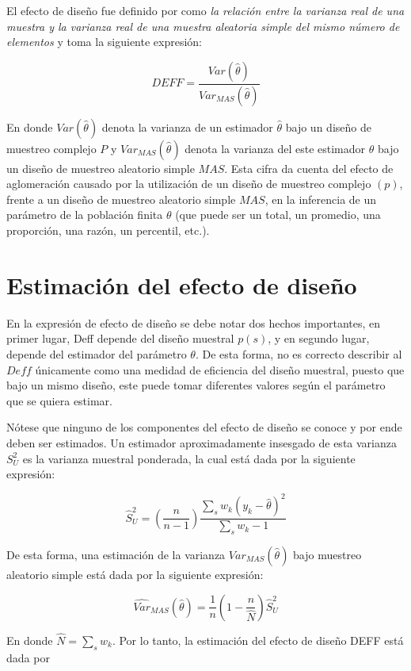 \documentclass[
  10pt,
  spanish,
]{book}
\begin{document}
El efecto de diseño fue definido por \citet[página 258]{Kish_1965} como \emph{la relación entre la varianza real de una muestra y la varianza real de una muestra aleatoria simple del mismo número de elementos} y toma la siguiente expresión:

\[
DEFF=\frac{Var(\hat{\theta})}{Var_{MAS}(\hat{\theta})}
\]

En donde \(Var(\hat{\theta})\) denota la varianza de un estimador \(\hat{\theta}\) bajo un diseño de muestreo complejo \(P\) y \(Var_{MAS}(\hat{\theta})\) denota la varianza del este estimador \(\hat{\theta}\) bajo un diseño de muestreo aleatorio simple \(MAS\). Esta cifra da cuenta del efecto de aglomeración causado por la utilización de un diseño de muestreo complejo \((p)\), frente a un diseño de muestreo aleatorio simple \(MAS\), en la inferencia de un parámetro de la población finita \(\theta\) (que puede ser un total, un promedio, una proporción, una razón, un percentil, etc.).

\hypertarget{estimaciuxf3n-del-efecto-de-diseuxf1o}{%
\section{Estimación del efecto de diseño}\label{estimaciuxf3n-del-efecto-de-diseuxf1o}}

En la expresión de efecto de diseño se debe notar dos hechos importantes, en primer lugar, Deff depende del diseño muestral \(p(s)\), y en segundo lugar, depende del estimador del parámetro \(\theta\). De esta forma, no es correcto describir al \(Deff\) únicamente como una medidad de eficiencia del diseño muestral, puesto que bajo un mismo diseño, este puede tomar diferentes valores según el parámetro que se quiera estimar.

Nótese que ninguno de los componentes del efecto de diseño se conoce y por ende deben ser estimados. Un estimador aproximadamente insesgado de esta varianza \(S^2_U\) es la varianza muestral ponderada, la cual está dada por la siguiente expresión:

\[
\hat{S}^2_U = \left(\frac{n}{n-1}\right)
\frac{\sum_s{ w_k ( y_k - \hat{\theta})^2}}{\sum_s{w_k} -1 }
\]

De esta forma, una estimación de la varianza \({Var}_{MAS}(\hat{\theta})\) bajo muestreo aleatorio simple está dada por la siguiente expresión:

\[
\widehat{Var}_{MAS}(\hat{\theta}) = \frac{1}{n} \left(1-\frac{n}{\hat N}\right)  \hat S^2_U
\]

En donde \(\hat N = \sum_s w_k\). Por lo tanto, la estimación del efecto de diseño DEFF está dada por
\end{document}
